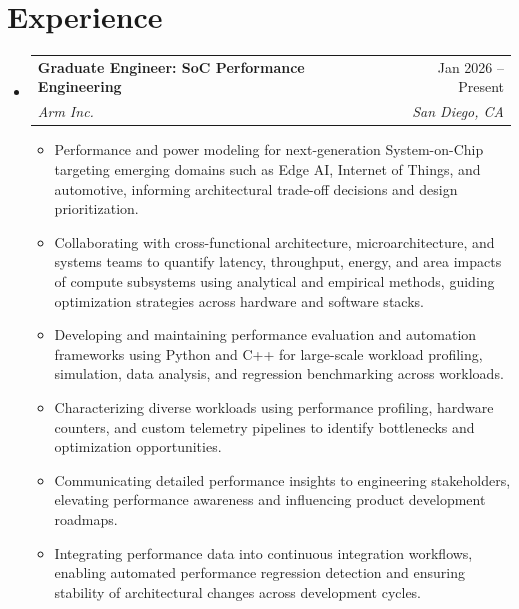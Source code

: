 \documentclass[letterpaper,11pt]{article}
\makeatletter
\newcommand{\resumeItem}[1]{
  \item\small{
    {#1 \vspace{-2pt}}
  }
}
\newcommand{\NresumeSubheading}[4]{
  \vspace{-2pt}\item
    \begin{tabular*}{0.97\textwidth}[t]{l@{\extracolsep{\fill}}r}
      \textbf{#1} & #2 \\
      \textit{\small#3} & \textit{\small#4} \\
    \end{tabular*}\vspace{-7pt}
}
\newcommand{\resumeSubHeadingListStart}{\begin{itemize}[leftmargin=0.15in, label={}]}
\newcommand{\resumeSubHeadingListEnd}{\end{itemize}}
\newcommand{\resumeItemListStart}{\begin{itemize}}
\newcommand{\resumeItemListEnd}{\end{itemize}\vspace{-5pt}}
\makeatother
\begin{document}


\section{Experience}

\resumeSubHeadingListStart
    \NresumeSubheading
      {Graduate Engineer: SoC Performance Engineering}{Jan 2026 -- Present}
      {Arm Inc.}{San Diego, CA}
      \resumeItemListStart
        \resumeItem{Performance and power modeling for next-generation System-on-Chip targeting emerging domains such as Edge AI, Internet of Things, and automotive, informing architectural trade-off decisions and design prioritization.}
        \resumeItem{Collaborating with cross-functional architecture, microarchitecture, and systems teams to quantify latency, throughput, energy, and area impacts of compute subsystems using analytical and empirical methods, guiding optimization strategies across hardware and software stacks.}
        \resumeItem{Developing and maintaining performance evaluation and automation frameworks using Python and C++ for large-scale workload profiling, simulation, data analysis, and regression benchmarking across workloads.}
        \resumeItem{Characterizing diverse workloads using performance profiling, hardware counters, and custom telemetry pipelines to identify bottlenecks and optimization opportunities.}
        \resumeItem{Communicating detailed performance insights to engineering stakeholders, elevating performance awareness and influencing product development roadmaps.}
        \resumeItem{Integrating performance data into continuous integration workflows, enabling automated performance regression detection and ensuring stability of architectural changes across development cycles.}
      \resumeItemListEnd
\resumeSubHeadingListEnd
\end{document}
